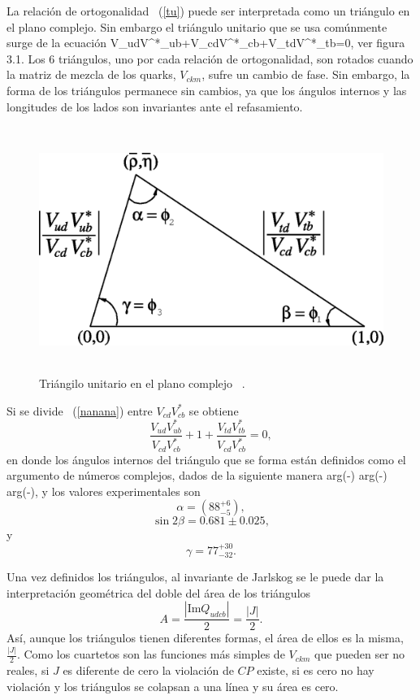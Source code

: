 La relaci\'on de ortogonalidad ~(\ref{tu}) puede ser interpretada como un
tri\'angulo en el plano complejo. Sin embargo el tri\'angulo unitario que se usa
com\'unmente surge de la ecuaci\'on
\be\label{nanana}
V_{ud}V^*_{ub}+V_{cd}V^*_{cb}+V_{td}V^*_{tb}=0,
\ee
ver figura 3.1. Los 6 tri\'angulos,
uno por cada relaci\'on de ortogonalidad, son rotados cuando la matriz de mezcla
de los quarks, $V_{ckm}$, sufre un cambio de fase. Sin embargo, la forma de los
tri\'angulos permanece sin cambios, ya que los \'angulos internos y las
longitudes de los lados son invariantes ante el refasamiento.
\begin{figure}\label{fig2}
\centering
\includegraphics[height=8cm,angle=0]{triangle2.eps}
\caption{Tri\'angilo unitario en el plano complejo ~\cite{Nak201001}.}
\end{figure}
Si se divide ~(\ref{nanana}) entre $V_{cd}V^*_{cb}$ se obtiene
$$
\frac{V_{ud}V^*_{ub}}{V_{cd}V^*_{cb}}+1+\frac{V_{td}V^*_{tb}}{V_{cd}V^*_{cb}}=0,
$$
en donde los \'angulos internos del tri\'angulo que se forma est\'an definidos 
como el argumento de n\'umeros complejos, dados de la siguiente manera
\be\label{alpha}
\alpha\equiv \mbox{arg}\left(-\right)
\ee
\be\label{beta}
\beta\equiv \mbox{arg}\left(-\right)
\ee
\be\label{gamma}
\gamma\equiv \mbox{arg}\left(-\right),
\ee
y los valores experimentales son ~\cite{Nak201001}
$$\alpha=(88^{+6}_{-5}),$$
$$\sin{2\beta}=0.681\pm{0.025},$$
y
$$\gamma=77^{+30}_{-32}.$$

Una vez definidos los tri\'angulos, al invariante de Jarlskog se le 
puede dar la interpretaci\'on geom\'etrica del doble del \'area de los 
tri\'angulos
$$
A=\frac{|\mbox{Im} Q_{udcb}|}{2}=\frac{|J|}{2}. 
$$
As\'i, aunque los tri\'angulos tienen diferentes formas, el \'area de ellos es
la misma, $\frac{|J|}{2}$. Como los cuartetos son las funciones m\'as simples de
$V_{ckm}$ que pueden ser no reales, si $J$ es diferente de cero la violaci\'on 
de $CP$ existe, si es cero no hay violaci\'on y los tri\'angulos se colapsan a
una l\'inea y su \'area es cero.
